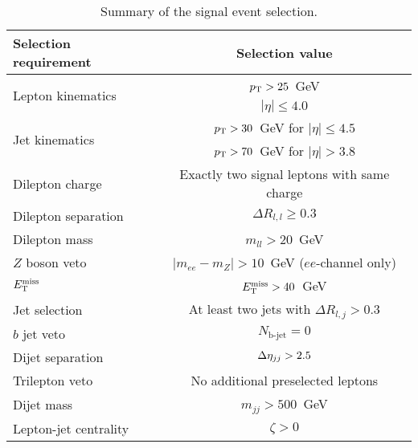 \begin{table}[htbp]
  \centering
  \begin{tabular}{l|c}
    Selection requirement              & Selection value \\
    \hline\hline
    \multirow{2}{*}{Lepton kinematics} & $p_{\mathrm{T}} > 25$~GeV \\
                                       & $|\eta| \le 4.0$ \\
    \multirow{2}{*}{Jet kinematics}    & $p_{\mathrm{T}} > 30$~GeV for $|\eta| \le 4.5$ \\
                                       & $p_{\mathrm{T}} > 70$~GeV for $|\eta| > 3.8$ \\
    \hline
    Dilepton charge                    & Exactly two signal leptons with same charge\\
    Dilepton separation                & $\Delta R_{l,l} \ge 0.3$ \\
    Dilepton mass                      & $m_{ll} > 20$~GeV\\
    $Z$ boson veto                     & $|m_{ee} - m_Z| > 10$~GeV ($ee$-channel only) \\
    $E_{\mathrm{T}}^{\mathrm{miss}}$                             & $E_{\mathrm{T}}^{\mathrm{miss}} > 40$~GeV \\
    Jet selection                      & At least two jets with $\Delta R_{l,j} > 0.3$\\
    $b$ jet veto                       & $N_{\textrm{b-jet}} = 0$\\
    Dijet separation                   & $\detajj > 2.5$\\
    Trilepton veto                     & No additional preselected leptons\\
    Dijet mass                         & $m_{jj} > 500$~GeV\\
    Lepton-jet centrality              & $\zeta > 0$\\
    \hline
  \end{tabular}
  \caption{Summary of the signal event selection.}
  \label{tab:sswwupgrade_event_selection}
\end{table}
